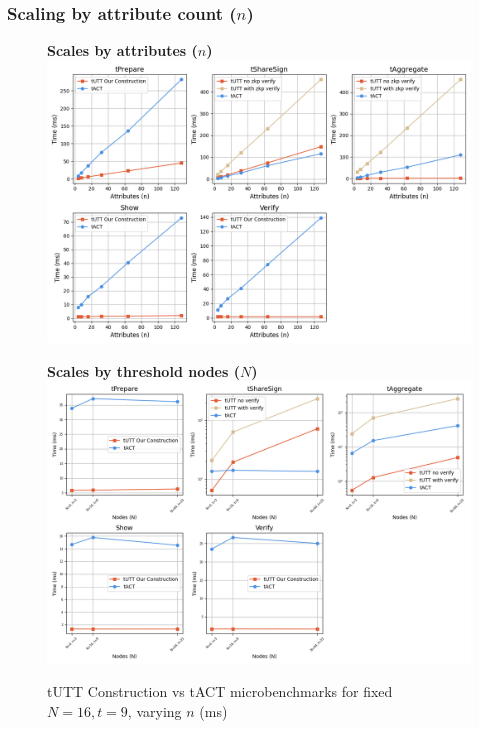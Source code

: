 \subsubsection{Scaling by attribute count ($n$)}
\begin{figure}[ht]
    \centering
    \caption[tUTT vs tACT microbenchmarks for fixed $N=16, t=9$, varying $n$]{%
      tUTT Construction vs tACT microbenchmarks for fixed $N=16, t=9$, varying $n$ (ms)%
    }
    \vspace{2em}

    \begin{minipage}[t]{1\linewidth}
        \centering
        \textbf{Scales by attributes ($n$)}\\[1em]
        \includegraphics[width=\linewidth]{figures/chap5_tutt_scale_by_n_attributes.png}
    \end{minipage}

    \vspace{3em}

    \begin{minipage}[t]{1\linewidth}
        \centering
        \textbf{Scales by threshold nodes ($N$)}\\[1em]
        \includegraphics[width=\linewidth]{figures/chap5_tutt_scale_by_N_nodes.png}
    \end{minipage}
    \label{fig:chap4_tutt_tact_microbenchmarks}
\end{figure}





